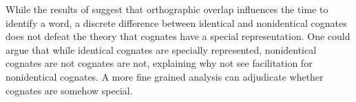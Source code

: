 

While the results of \textcite{Duyck2007} suggest that orthographic overlap influences the time to identify a word, a discrete difference between identical and nonidentical cognates does not defeat the theory that cognates have a special representation. One could argue that while identical cognates are specially represented, nonidentical cognates are not cognates are not, explaining why \textcite{Duyck2007}  not see facilitation for nonidentical cognates. A more fine grained analysis can adjudicate whether cognates are somehow special.

